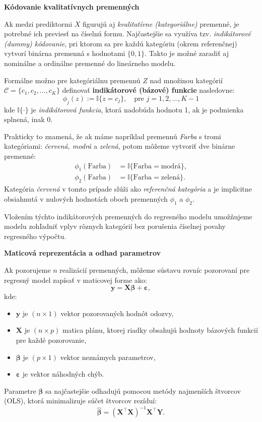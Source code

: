 \smallskip
\noindent
\textbf{Kódovanie kvalitatívnych premenných}

Ak medzi prediktormi $X$ figurujú aj \textit{kvalitatívne (kategoriálne)} premenné, je potrebné ich previesť na číselnú formu. Najčastejšie sa využíva tzv. \textit{indikátorové (dummy) kódovanie}, pri ktorom sa pre každú kategóriu (okrem referenčnej) vytvorí binárna premenná s hodnotami $\{0, 1\}$. Takto je možné zaradiť aj nominálne a ordinálne premenné do lineárneho modelu.

Formálne možno pre kategóriálnu premennú $Z$ nad množinou kategórií $\mathcal{C} = \{c_1, c_2, \dots, c_K\}$ definovať \textbf{indikátorové (bázové) funkcie} nasledovne:
\begin{equation}
\phi_j(z) := \mathbb{I}\{z = c_j\}, \quad \text{pre } j = 1, 2, \dots, K-1
\end{equation}
kde $\mathbb{I}\{\cdot\}$ je \textit{indikátorová funkcia}, ktorá nadobúda hodnotu 1, ak je podmienka splnená, inak 0.

Prakticky to znamená, že ak máme napríklad premennú \textit{Farba} s tromi kategóriami: \textit{červená, modrá} a \textit{zelená}, potom môžeme vytvoriť dve binárne premenné:
\begin{align*}
\phi_1(\text{Farba}) &= \mathbb{I}\{\text{Farba} = \text{modrá}\}, \\
\phi_2(\text{Farba}) &= \mathbb{I}\{\text{Farba} = \text{zelená}\}.
\end{align*}
Kategória \textit{červená} v tomto prípade slúži ako \textit{referenčná kategória} a je implicitne obsiahnutá v nulových hodnotách oboch premenných $\phi_1$ a $\phi_2$.

Vložením týchto indikátorových premenných do regresného modelu umožňujeme modelu zohľadniť vplyv rôznych kategórií bez porušenia číselnej povahy regresného výpočtu.

\smallskip
\noindent
\textbf{Maticová reprezentácia a odhad parametrov}

Ak pozorujeme $n$ realizácií premenných, môžeme sústavu rovníc pozorovaní pre regresný model zapísať v maticovej forme ako:
\begin{equation}
\mathbf{y} = \mathbf{X} \boldsymbol{\beta} + \boldsymbol{\varepsilon},
\end{equation}
kde:
\begin{itemize}
  \item $\mathbf{y}$ je $(n \times 1)$ vektor pozorovaných hodnôt odozvy,
  \item $\mathbf{X}$ je $(n \times p)$ matica plánu, ktorej riadky obsahujú hodnoty bázových funkcií pre každé pozorovanie,
  \item $\boldsymbol{\beta}$ je $(p \times 1)$ vektor neznámych parametrov,
  \item $\boldsymbol{\varepsilon}$ je vektor náhodných chýb.
\end{itemize}
Parametre $\boldsymbol{\beta}$ sa najčastejšie odhadujú pomocou metódy najmenších štvorcov (OLS), ktorá minimalizuje súčet štvorcov rezíduí:
\[
\hat{\boldsymbol{\beta}} = (\mathbf{X}^\top \mathbf{X})^{-1} \mathbf{X}^\top \mathbf{Y}.
\]

